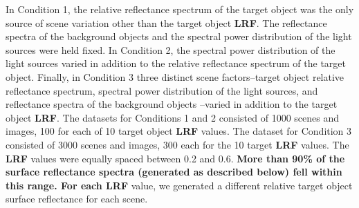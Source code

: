 \documentclass{jov}
\providecommand{\DIFaddtex}[1]{{\bf #1}} %
\providecommand{\DIFdeltex}[1]{} %
\providecommand{\DIFaddbegin}{} %
\providecommand{\DIFaddend}{} %
\providecommand{\DIFdelbegin}{} %
\providecommand{\DIFdelend}{} %
\providecommand{\DIFadd}[1]{\texorpdfstring{\DIFaddtex{#1}}{#1}} %
\providecommand{\DIFdel}[1]{\texorpdfstring{\DIFdeltex{#1}}{}} %
\newcommand{\DIFscaledelfig}{0.5}
\newlength{\DIFdelgraphicswidth} %
\newlength{\DIFdelgraphicsheight} %
\newcommand{\DIFaddincludegraphics}[2][]{{\color{blue}\fbox{\DIFOincludegraphics[#1]{#2}}}} %
\newcommand{\DIFdelincludegraphics}[2][]{%
\sbox{\DIFdelgraphicsbox}{\DIFOincludegraphics[#1]{#2}}%
\settoboxwidth{\DIFdelgraphicswidth}{\DIFdelgraphicsbox} %
\settoboxtotalheight{\DIFdelgraphicsheight}{\DIFdelgraphicsbox} %
\scalebox{\DIFscaledelfig}{%
\parbox[b]{\DIFdelgraphicswidth}{\usebox{\DIFdelgraphicsbox}\\[-\baselineskip] \rule{\DIFdelgraphicswidth}{0em}}\llap{\resizebox{\DIFdelgraphicswidth}{\DIFdelgraphicsheight}{%
\setlength{\unitlength}{\DIFdelgraphicswidth}%
\begin{picture}(1,1)%
\thicklines\linethickness{2pt} %
{\color[rgb]{1,0,0}\put(0,0){\framebox(1,1){}}}%
{\color[rgb]{1,0,0}\put(0,0){\line( 1,1){1}}}%
{\color[rgb]{1,0,0}\put(0,1){\line(1,-1){1}}}%
\end{picture}%
}\hspace*{3pt}}} %
} %
\DeclareRobustCommand{\DIFaddbegin}{\DIFOaddbegin \let\includegraphics\DIFaddincludegraphics} %
\DeclareRobustCommand{\DIFaddend}{\DIFOaddend \let\includegraphics\DIFOincludegraphics} %
\DeclareRobustCommand{\DIFdelbegin}{\DIFOdelbegin \let\includegraphics\DIFdelincludegraphics} %
\DeclareRobustCommand{\DIFdelend}{\DIFOaddend \let\includegraphics\DIFOincludegraphics} %
\begin{document}
In Condition 1, the relative reflectance spectrum of the target object was the only source of scene variation other than the target object \DIFdelbegin \DIFdel{LRV}\DIFdelend \DIFaddbegin \DIFadd{LRF}\DIFaddend .
The reflectance spectra of the background objects and the spectral power distribution of the light sources were held fixed.
In Condition 2, the spectral power distribution of the light sources varied in addition to the relative reflectance spectrum of the target object.
Finally, in Condition 3 three distinct scene factors--target object relative reflectance spectrum, spectral power distribution of the light sources, and reflectance spectra of the background objects
--varied in addition to the target object \DIFdelbegin \DIFdel{LRV}\DIFdelend \DIFaddbegin \DIFadd{LRF}\DIFaddend .
The datasets for Conditions 1 and 2 consisted of 1000 scenes and images, 100 for each of 10 target object \DIFdelbegin \DIFdel{LRV }\DIFdelend \DIFaddbegin \DIFadd{LRF }\DIFaddend values. 
The dataset for Condition 3 consisted of 3000 scenes and images, 300 each for the 10 target \DIFdelbegin \DIFdel{LRV }\DIFdelend \DIFaddbegin \DIFadd{LRF }\DIFaddend values.
The \DIFdelbegin \DIFdel{LRV }\DIFdelend \DIFaddbegin \DIFadd{LRF }\DIFaddend values were equally spaced between 0.2 and 0.6.
\DIFdelbegin \DIFdel{For each LRV }\DIFdelend \DIFaddbegin \DIFadd{More than 90\% of the surface reflectance spectra (generated as described below) fell within this range.
For each LRF }\DIFaddend value, we generated a different relative target object surface reflectance for each scene. 
\end{document}

